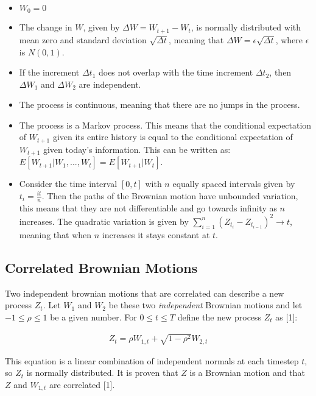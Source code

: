 \documentclass[12pt,twoside]{reedthesis}
\theoremstyle{definition}
\theoremstyle{definition}
\theoremstyle{remark}
\begin{document}
  \begin{itemize}
  \item
    \(W_{0}=0\)
  \item
    The change in \(W\), given by \(\Delta W = W_{t+1}-W_{t}\), is
    normally distributed with mean zero and standard deviation
    \(\sqrt{\Delta t}\), meaning that
    \(\Delta W = \epsilon\sqrt{\Delta t}\), where \(\epsilon\) is
    \(N(0,1)\).
  \item
    If the increment \(\Delta t_1\) does not overlap with the time
    increment \(\Delta t_2\), then \(\Delta W_1\) and \(\Delta W_2\) are
    independent.
  \item
    The process is continuous, meaning that there are no jumps in the
    process.
  \item
    The process is a Markov process. This means that the conditional
    expectation of \(W_{t+1}\) given its entire history is equal to the
    conditional expectation of \(W_{t+1}\) given today's information. This
    can be written as: \(E[W_{t+1}|W_1, ..., W_t] = E[W_{t+1}|W_t]\).
  \item
    Consider the time interval \([0,t]\) with \(n\) equally spaced
    intervals given by \(t_i = \frac{it}{n}\). Then the paths of the
    Brownian motion have unbounded variation, this means that they are not
    differentiable and go towards infinity as \(n\) increases. The
    quadratic variation is given by
    \(\sum_{i=1}^{n}{(Z_{t_i}-Z_{t_{i-1}})^2} \rightarrow t\), meaning
    that when \(n\) increases it stays constant at \(t\).
  \end{itemize}
  
  \subsection{Correlated Brownian Motions}\label{corr}
  
  Two independent brownian motions that are correlated can describe a new
  process \(Z_t\). Let \(W_1\) and \(W_2\) be these two \emph{independent}
  Brownian motions and let \(-1 \leq \rho \leq 1\) be a given number. For
  \(0 \leq t \leq T\) define the new process \(Z_t\) as {[}1{]}:
  
  \begin{align}
  \label{eq:corr_brow}
  Z_t = \rho W_{1,t} + \sqrt{1-\rho^2}W_{2,t}
  \end{align}
  
  \noindent
  This equation is a linear combination of independent normals at each
  timestep \(t\), so \(Z_t\) is normally distributed. It is proven that
  \(Z\) is a Brownian motion and that \(Z\) and \(W_{1,t}\) are correlated
  {[}1{]}.
  
\end{document}

